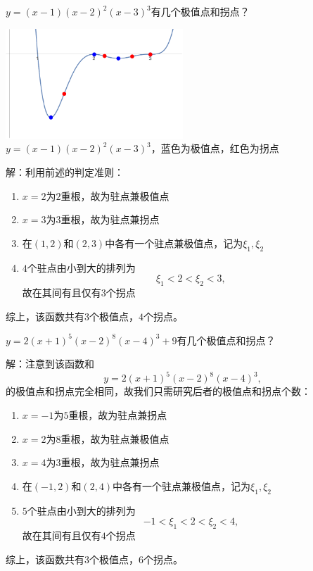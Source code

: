 \begin{shaded}
	\egz $y=(x-1)(x-2)^2(x-3)^3$有几个极值点和拐点？
	
	\begin{center}
		\includegraphics[width=0.5\textwidth]
		{./images/ch03/x1x22x33.pdf}\\
		\kaishu $y=(x-1)(x-2)^2(x-3)^3$，蓝色为极值点，红色为拐点
	\end{center}
	
	解：利用前述的判定准则：
	\begin{enumerate}[(1)]
  	  \setlength{\itemindent}{1cm}
	  \item $x=2$为$2$重根，故为驻点兼极值点
	  \item $x=3$为$3$重根，故为驻点兼拐点
	  \item 在$(1,2)$和$(2,3)$中各有一个驻点兼极值点，记为$\xi_1,\xi_2$
	  \item $4$个驻点由小到大的排列为
	  $$\xi_1<2<\xi_2<3,$$
	  故在其间有且仅有$3$个拐点
	\end{enumerate}
	
	综上，该函数共有$3$个极值点，$4$个拐点。
	
	\egz $y=2(x+1)^5(x-2)^8(x-4)^3+9$有几个极值点和拐点？
	
	解：注意到该函数和
	$$y=2(x+1)^5(x-2)^8(x-4)^3,$$
	的极值点和拐点完全相同，故我们只需研究后者的极值点和拐点个数：
	\begin{enumerate}[(1)]
  	  \setlength{\itemindent}{1cm}
	  \item $x=-1$为$5$重根，故为驻点兼拐点
	  \item $x=2$为$8$重根，故为驻点兼极值点
	  \item $x=4$为$3$重根，故为驻点兼拐点
	  \item 在$(-1,2)$和$(2,4)$中各有一个驻点兼极值点，记为$\xi_1,\xi_2$
	  \item $5$个驻点由小到大的排列为
	  $$-1<\xi_1<2<\xi_2<4,$$
	  故在其间有且仅有$4$个拐点
	\end{enumerate}
	
	综上，该函数共有$3$个极值点，$6$个拐点。
	
\end{shaded}

